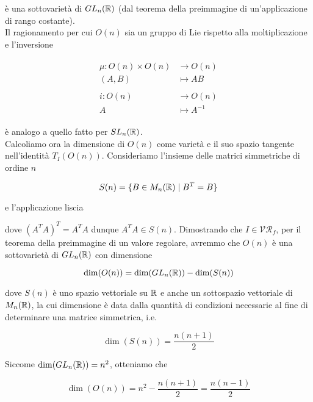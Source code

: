 è una sottovarietà di $ GL_{n}(\mathbb{R}) $ (dal teorema della preimmagine di un'applicazione di rango costante).\\
Il ragionamento per cui $ O(n) $ sia un gruppo di Lie rispetto alla moltiplicazione e l'inversione

\begin{align}
	\begin{split}
		\mu : O(n) \times O(n) &\to O(n)\\
		(A,B) &\mapsto A B\\\\
		i : O(n) &\to O(n)\\
		A &\mapsto A^{-1}
	\end{split}
\end{align}

è analogo a quello fatto per $ SL_{n}(\mathbb{R}) $.\\
Calcoliamo ora la dimensione di $ O(n) $ come varietà e il suo spazio tangente nell'identità $ T_{I}(O(n)) $. Consideriamo l'insieme delle matrici simmetriche di ordine $ n $

\begin{equation}
	S(n) = \{ B \in M_{n}(\mathbb{R}) \mid B^{T} = B \}
\end{equation}

e l'applicazione liscia


dove $ (A^{T} A)^{T} = A^{T} A $ dunque $ A^{T} A \in S(n) $. Dimostrando che $ I \in \mathcal{VR}_{f} $, per il teorema della preimmagine di un valore regolare, avremmo che $ O(n) $ è una sottovarietà di $ GL_{n}(\mathbb{R}) $ con dimensione

\begin{equation}
	\dim(O(n)) = \dim(GL_{n}(\mathbb{R})) - \dim(S(n))
\end{equation}

dove $ S(n) $ è uno spazio vettoriale su $ \mathbb{R} $ e anche un sottospazio vettoriale di $ M_{n}(\mathbb{R}) $, la cui dimensione è data dalla quantità di condizioni necessarie al fine di determinare una matrice simmetrica, i.e.

\begin{equation}
	\dim(S(n)) = \dfrac{n (n+1)}{2}
\end{equation}

Siccome $ \dim(GL_{n}(\mathbb{R})) = n^{2} $, otteniamo che

\begin{equation}
	\dim(O(n)) = n^{2} - \dfrac{n (n+1)}{2} = \dfrac{n (n-1)}{2}
\end{equation}

